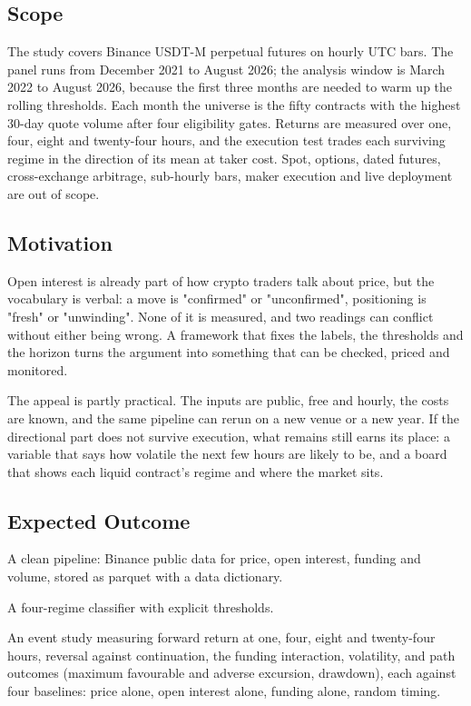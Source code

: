 \documentclass[11pt,a4paper]{article}
\begin{document}
\subsection{Scope}

The study covers Binance USDT-M perpetual futures on hourly UTC bars. The panel runs from December 2021 to August 2026; the analysis window is March 2022 to August 2026, because the first three months are needed to warm up the rolling thresholds. Each month the universe is the fifty contracts with the highest 30-day quote volume after four eligibility gates. Returns are measured over one, four, eight and twenty-four hours, and the execution test trades each surviving regime in the direction of its mean at taker cost. Spot, options, dated futures, cross-exchange arbitrage, sub-hourly bars, maker execution and live deployment are out of scope.

\subsection{Motivation}

Open interest is already part of how crypto traders talk about price, but the vocabulary is verbal: a move is "confirmed" or "unconfirmed", positioning is "fresh" or "unwinding". None of it is measured, and two readings can conflict without either being wrong. A framework that fixes the labels, the thresholds and the horizon turns the argument into something that can be checked, priced and monitored.

The appeal is partly practical. The inputs are public, free and hourly, the costs are known, and the same pipeline can rerun on a new venue or a new year. If the directional part does not survive execution, what remains still earns its place: a variable that says how volatile the next few hours are likely to be, and a board that shows each liquid contract's regime and where the market sits.

\subsection{Expected Outcome}

A clean pipeline: Binance public data for price, open interest, funding and volume, stored as parquet with a data dictionary.

A four-regime classifier with explicit thresholds.

An event study measuring forward return at one, four, eight and twenty-four hours, reversal against continuation, the funding interaction, volatility, and path outcomes (maximum favourable and adverse excursion, drawdown), each against four baselines: price alone, open interest alone, funding alone, random timing.
\end{document}
